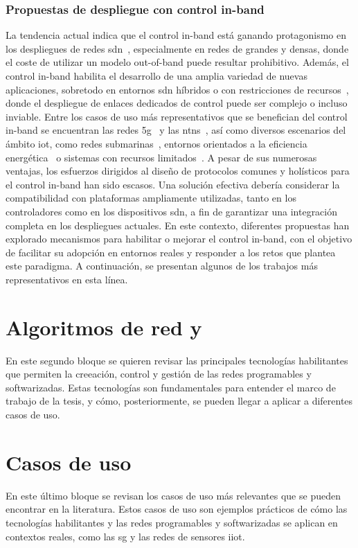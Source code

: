 \subsubsection{Propuestas de despliegue con control in-band}
\label{subsubsec:propuestas_inband}

La tendencia actual indica que el control in-band está ganando protagonismo en los despliegues de redes \gls{sdn}~\cite{Awan19}, especialmente en redes de grandes y densas, donde el coste de utilizar un modelo out-of-band puede resultar prohibitivo. Además, el control in-band habilita el desarrollo de una amplia variedad de nuevas aplicaciones, sobretodo en entornos \gls{sdn} híbridos o con restricciones de recursos~\cite{Khorsandroo21,Rojas21}, donde el despliegue de enlaces dedicados de control puede ser complejo o incluso inviable. Entre los casos de uso más representativos que se benefician del control in-band se encuentran las redes \gls{5g}~\cite{Murtadha21} y las \glspl{ntn}~\cite{Guo21}, así como diversos escenarios del ámbito \gls{iot}, como redes submarinas~\cite{Shi22}, entornos orientados a la eficiencia energética~\cite{Maity22} o sistemas con recursos limitados~\cite{Chattopadhyay19}. A pesar de sus numerosas ventajas, los esfuerzos dirigidos al diseño de protocolos comunes y holísticos para el control in-band han sido escasos. Una solución efectiva debería considerar la compatibilidad con plataformas ampliamente utilizadas, tanto en los controladores como en los dispositivos \gls{sdn}, a fin de garantizar una integración completa en los despliegues actuales. En este contexto, diferentes propuestas han explorado mecanismos para habilitar o mejorar el control in-band, con el objetivo de facilitar su adopción en entornos reales y responder a los retos que plantea este paradigma. A continuación, se presentan algunos de los trabajos más representativos en esta línea.







\section{Algoritmos de red y }
\label{sec:tecnologias_habilitantes}

En este segundo bloque se quieren revisar las principales tecnologías habilitantes que permiten la creeación, control y gestión de las redes programables y softwarizadas. Estas tecnologías son fundamentales para entender el marco de trabajo de la tesis, y cómo, posteriormente, se pueden llegar a aplicar a diferentes casos de uso. 


\section{Casos de uso}  
\label{sec:casos_de_uso}
En este último bloque se revisan los casos de uso más relevantes que se pueden encontrar en la literatura. Estos casos de uso son ejemplos prácticos de cómo las tecnologías habilitantes y las redes programables y softwarizadas se aplican en contextos reales, como las \gls{sg} y las redes de sensores \gls{iiot}. 
